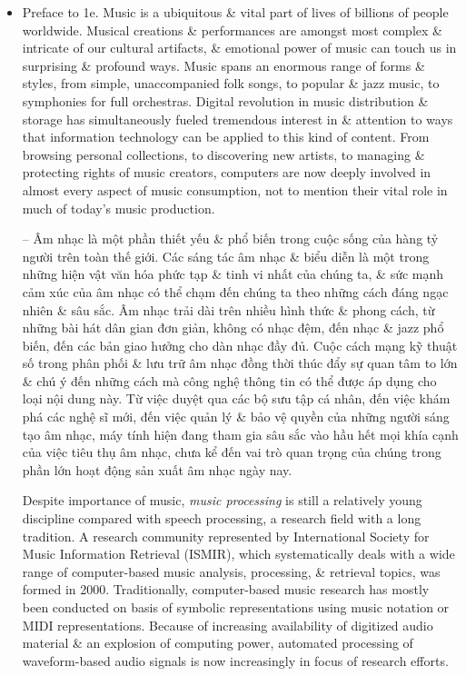 \documentclass{article}
\begin{document}
\begin{itemize}
	\item {\sf Preface to 1e.} Music is a ubiquitous \& vital part of lives of billions of people worldwide. Musical creations \& performances are amongst most complex \& intricate of our cultural artifacts, \& emotional power of music can touch us in surprising \& profound ways. Music spans an enormous range of forms \& styles, from simple, unaccompanied folk songs, to popular \& jazz music, to symphonies for full orchestras. Digital revolution in music distribution \& storage has simultaneously fueled tremendous interest in \& attention to ways that information technology can be applied to this kind of content. From browsing personal collections, to discovering new artists, to managing \& protecting rights of music creators, computers are now deeply involved in almost every aspect of music consumption, not to mention their vital role in much of today's music production.
	
	-- Âm nhạc là một phần thiết yếu \& phổ biến trong cuộc sống của hàng tỷ người trên toàn thế giới. Các sáng tác âm nhạc \& biểu diễn là một trong những hiện vật văn hóa phức tạp \& tinh vi nhất của chúng ta, \& sức mạnh cảm xúc của âm nhạc có thể chạm đến chúng ta theo những cách đáng ngạc nhiên \& sâu sắc. Âm nhạc trải dài trên nhiều hình thức \& phong cách, từ những bài hát dân gian đơn giản, không có nhạc đệm, đến nhạc \& jazz phổ biến, đến các bản giao hưởng cho dàn nhạc đầy đủ. Cuộc cách mạng kỹ thuật số trong phân phối \& lưu trữ âm nhạc đồng thời thúc đẩy sự quan tâm to lớn \& chú ý đến những cách mà công nghệ thông tin có thể được áp dụng cho loại nội dung này. Từ việc duyệt qua các bộ sưu tập cá nhân, đến việc khám phá các nghệ sĩ mới, đến việc quản lý \& bảo vệ quyền của những người sáng tạo âm nhạc, máy tính hiện đang tham gia sâu sắc vào hầu hết mọi khía cạnh của việc tiêu thụ âm nhạc, chưa kể đến vai trò quan trọng của chúng trong phần lớn hoạt động sản xuất âm nhạc ngày nay.
	
	Despite importance of music, {\it music processing} is still a relatively young discipline compared with speech processing, a research field with a long tradition. A research community represented by International Society for Music Information Retrieval (ISMIR), which systematically deals with a wide range of computer-based music analysis, processing, \& retrieval topics, was formed in 2000. Traditionally, computer-based music research has mostly been conducted on basis of symbolic representations using music notation or MIDI representations. Because of increasing availability of digitized audio material \& an explosion of computing power, automated processing of waveform-based audio signals is now increasingly in focus of research efforts.
	

\end{itemize}
\end{document}
